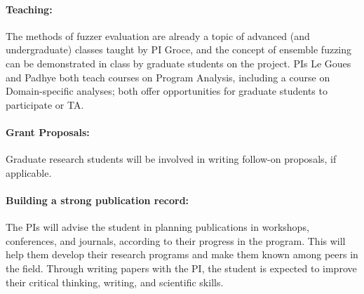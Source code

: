 \documentclass[12pt]{article}
\begin{document}
\paragraph{Teaching:}  The methods of fuzzer evaluation are already a topic of advanced (and undergraduate) classes taught by PI Groce, and the concept of ensemble fuzzing can be demonstrated in class by graduate students on the project.  PIs Le Goues and Padhye both teach courses on Program Analysis, including a course on Domain-specific analyses; both offer opportunities for graduate students to participate or TA. 

\paragraph{Grant Proposals:}  Graduate research students will be involved in writing follow-on proposals, if applicable.

\paragraph{Building a strong publication record:}  The PIs will advise the student in planning publications in workshops, conferences, and journals, according to their progress in the program. This will help them develop their research programs and make them known among peers in the field. Through writing papers with the PI, the student is expected to improve their critical thinking, writing, and scientific skills.
\end{document}
